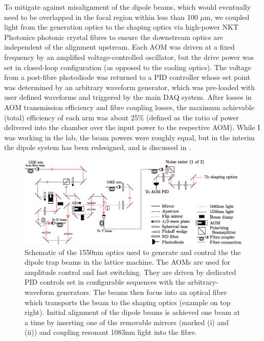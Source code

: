 	To mitigate against misalignment of the dipole beams, which would eventually need to be overlapped in the focal region within less than 100 $\mu$m, we coupled light from the generation optics to the shaping optics via high-power NKT Photonics photonic crystal fibres to ensure the downstream optics are independent of the alignment upstream.
	Each AOM was driven at a fixed frequency by an amplified voltage-controlled oscillator, but the drive power was set in closed-loop configuration (as opposed to the cooling optics).
	The voltage from a post-fibre photodiode was returned to a PID controller whose set point was determined by an arbitrary waveform generator, which was pre-loaded with user defined waveforms and triggered by the main DAQ system.
	After losses in AOM transmission efficiency and fibre coupling losses, the maximum achievable (total) efficiency of each arm was about 25\% (defined as the ratio of power delivered into the chamber over the input power to the respective AOM).
	While I was working in the lab, the beam powers were roughly equal, but in the interim the dipole system has been redesigned, and is discussed in \cite{Abbas21}.
	
	
	\begin{figure}
		\centering
		\includegraphics[width=\textwidth]{fig/lattice/dipole_optics}
		\caption{Schematic of the 1550nm optics used to generate and control the the dipole trap beams in the lattice machine.
		The AOMs are used for amplitude control and fast switching.
		They are driven by dedicated PID controls set in configurable sequences with the arbitrary-waveform generators.
		The beams then focus into an optical fibre which transports the beam to the shaping optics (example on top right).
		Initial alignment of the dipole beams is achieved one beam at a time by inserting one of the removable mirrors (marked (i) and (ii)) and coupling resonant 1083nm light into the fibre.}
		\label{fig:dipole_optics}
	\end{figure}
	

